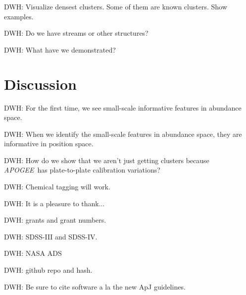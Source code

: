 \documentclass[12pt, letterpaper, preprint]{aastex}
\newcommand{\acronym}[1]{{\small{#1}}}
\newcommand{\project}[1]{\textsl{#1}}
\newcommand{\apogee}{\project{\acronym{APOGEE}}}
\begin{document}
DWH: Visualize densest clusters.  Some of them are known clusters.
Show examples.

DWH: Do we have streams or other structures?

DWH: What have we demonstrated?

\section{Discussion}

DWH: For the first time, we see small-scale informative features in abundance space.

DWH: When we identify the small-scale features in abundance space, they are informative in position space.

DWH: How do we show that we aren't just getting clusters because \apogee\ has plate-to-plate calibration variations?

DWH: Chemical tagging will work.

\acknowledgements
DWH: It is a pleasure to thank...

DWH: grants and grant numbers.

DWH: SDSS-III and SDSS-IV.

DWH: NASA ADS

DWH: github repo and hash.

DWH: Be sure to cite software a la the new ApJ guidelines.
\end{document}
